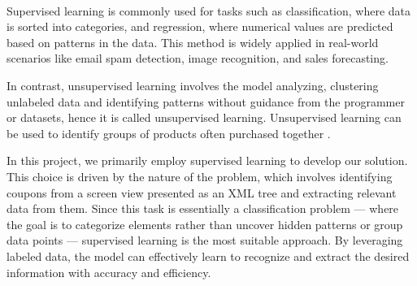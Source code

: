 \documentclass[licencjacka,en]{pracamgr}
\begin{document}
\begin{center}
    \begin{minipage}{0.9\textwidth} %
    \end{minipage}\\[5mm] %
    \begin{minipage}{0.9\textwidth} %
    \end{minipage}
\end{center}

Supervised learning is commonly used for tasks such as classification, where data is sorted into categories, and regression, where numerical values are predicted based on patterns in the data. This method is widely applied in real-world scenarios like email spam detection, image recognition, and sales forecasting.

In contrast, unsupervised learning involves the model analyzing, clustering unlabeled data and identifying patterns without guidance from the programmer or datasets, hence it is called unsupervised learning. Unsupervised learning can be used to identify groups of products often purchased together \cite{supervised_ibm}.

In this project, we primarily employ supervised learning to develop our solution. This choice is driven by the nature of the problem, which involves identifying coupons from a screen view presented as an XML tree and extracting relevant data from them. Since this task is essentially a classification problem — where the goal is to categorize elements rather than uncover hidden patterns or group data points — supervised learning is the most suitable approach. By leveraging labeled data, the model can effectively learn to recognize and extract the desired information with accuracy and efficiency.
\end{document}
